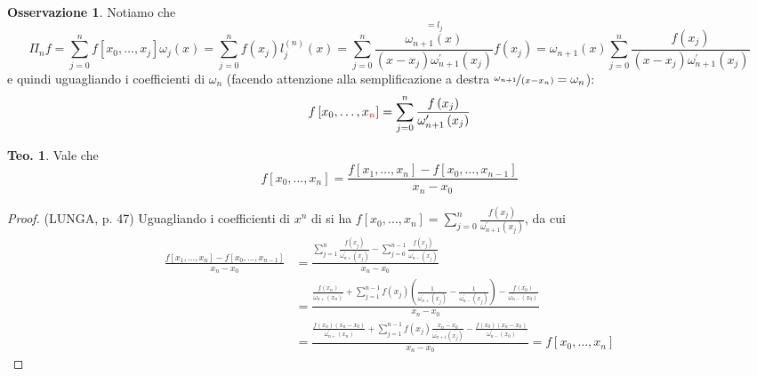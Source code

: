 \documentclass[a4paper,10pt]{article}
\theoremstyle{definition}
\theoremstyle{indentdefinition}
\theoremstyle{indenttheorem}
\newtheorem{thm}{Teo.}
\theoremstyle{myremark}
\newtheorem*{rem*}{Osservazione}
\theoremstyle{indentgeneral}
\theoremstyle{plain}
\theoremstyle{plain}
\begin{document}
\begin{rem*}
    Notiamo che $${\Pi_{n}f=\sum_{j=0}^{n}f\left[x_{0},\dots,x_{j}\right]\omega_{j}\left(x\right)}=\sum_{j=0}^{n}f\left(x_{j}\right)l_{j}^{\left(n\right)}\left(x\right)=\sum_{j=0}^{n}\overset{=l_j}{\boxed{\frac{\omega_{n+1}\left(x\right)}{\left(x-x_{j}\right)\omega_{n+1}^{\prime}\left(x_{j}\right)}}}f\left(x_{j}\right)=\omega_{n+1}\left(x\right)\sum_{j=0}^{n}\frac{f\left(x_{j}\right)}{\left(x-x_{j}\right)\omega_{n+1}^{\prime}\left(x_{j}\right)}$$
    e quindi uguagliando i coefficienti di $\omega_n$ (facendo attenzione alla semplificazione a destra $\nicefrac{\omega_{n+1}}{(x-x_n)}=\omega_n$):
    $$f\left[x_{0},\dots,x_{\textcolor{red}{n}}\right]=\sum_{j=0}^{n}\frac{f\left(x_{j}\right)}{\omega_{n+1}^{\prime}\left(x_{j}\right)}$$
\end{rem*}

\begin{thm}
Vale che $$f\left[x_{0},\dots,x_{n}\right]=\frac{f\left[x_{1},\dots,x_{n}\right]-f\left[x_{0},\dots,x_{n-1}\right]}{x_{n}-x_{0}}$$
\end{thm}

\begin{proof} (LUNGA, p. 47)
Uguagliando i coefficienti di $x^{n}$ di 
si ha $f\left[x_{0},\dots,x_{n}\right]=\sum_{j=0}^{n}\frac{f\left(x_{j}\right)}{\omega_{n+1}^{\prime}\left(x_{j}\right)}$,
da cui 
\begin{align*}
\frac{f\left[x_{1},\dots,x_{n}\right]-f\left[x_{0},\dots,x_{n-1}\right]}{x_{n}-x_{0}} & =\frac{\sum_{j=1}^{n}\frac{f\left(x_{j}\right)}{\omega_{n+}^{\prime}\left(x_{j}\right)}-\sum_{j=0}^{n-1}\frac{f\left(x_{j}\right)}{\omega_{n-}^{\prime}\left(x_{j}\right)}}{x_{n}-x_{0}}\\
 & =\frac{\frac{f\left(x_{n}\right)}{\omega_{n+}^{\prime}\left(x_{n}\right)}+\sum_{j=1}^{n-1}f\left(x_{j}\right)\left(\frac{1}{\omega_{n+}^{\prime}\left(x_{j}\right)}-\frac{1}{\omega_{n-}^{\prime}\left(x_{j}\right)}\right)-\frac{f\left(x_{0}\right)}{\omega_{n-}^{\prime}\left(x_{0}\right)}}{x_{n}-x_{0}}\\
 & =\frac{\frac{f\left(x_{n}\right)\left(x_{n}-x_{0}\right)}{\omega_{n+}^{\prime}\left(x_{n}\right)}+\sum_{j=1}^{n-1}f\left(x_{j}\right)\frac{x_{n}-x_{0}}{\omega_{n+1}^{\prime}\left(x_{j}\right)}-\frac{f\left(x_{0}\right)\left(x_{n}-x_{0}\right)}{\omega_{n-}^{\prime}\left(x_{0}\right)}}{x_{n}-x_{0}}=f\left[x_{0},\dots,x_{n}\right]
\end{align*}
\end{proof}
\end{document}
